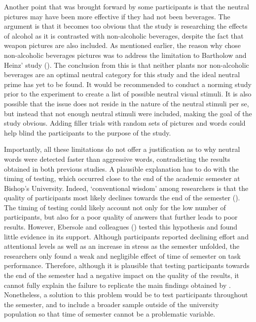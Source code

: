 \documentclass[serif, twocolumn, numeric, empirical]{jote-article}
\begin{document}
Another point that was brought forward by some participants is that the neutral pictures may have been more effective if they had not been beverages. The argument is that it becomes too obvious that the study is researching the effects of alcohol as it is contrasted with non-alcoholic beverages, despite the fact that weapon pictures are also included. As mentioned earlier, the reason why \textcite{SubraMullerBegueLBushmanDelmas2010} chose non-alcoholic beverages pictures was to address the limitation to Bartholow and Heinz’ study (\cite{BartholowHeinz2006}). The conclusion from this is that neither plants nor non-alcoholic beverages are an optimal neutral category for this study and the ideal neutral prime has yet to be found. It would be recommended to conduct a norming study prior to the experiment to create a list of possible neutral visual stimuli. It is also possible that the issue does not reside in the nature of the neutral stimuli per se, but instead that not enough neutral stimuli were included, making the goal of the study obvious. Adding filler trials with random sets of pictures and words could help blind the participants to the purpose of the study. 

Importantly, all these limitations do not offer a justification as to why neutral words were detected faster than aggressive words, contradicting the results obtained in both previous studies. A plausible explanation has to do with the timing of testing, which occurred close to the end of the academic semester at Bishop’s University. Indeed, ‘conventional wisdom’ among researchers is that the quality of participants most likely declines towards the end of the semester (\cite{EbersoleAthertonBelangerSkulborstadAllenBanks2016}). The timing of testing could likely account not only for the low number of participants, but also for a poor quality of answers that further leads to poor results. However, Ebersole and colleagues (\cite{EbersoleAthertonBelangerSkulborstadAllenBanks2016}) tested this hypothesis and found little evidence in its support. Although participants reported declining effort and attentional levels as well as an increase in stress as the semester unfolded, the researchers only found a weak and negligible effect of time of semester on task performance. Therefore, although it is plausible that testing participants towards the end of the semester had a negative impact on the quality of the results, it cannot fully explain the failure to replicate the main findings obtained by \textcite{BartholowHeinz2006}. Nonetheless, a solution to this problem would be to test participants throughout the semester, and to include a broader sample outside of the university population so that time of semester cannot be a problematic variable. 
\end{document}
